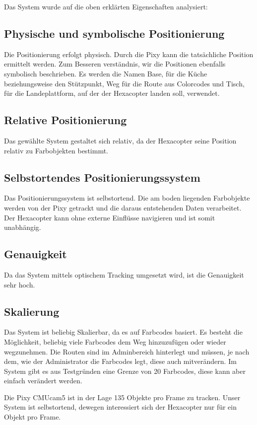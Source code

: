   Das System wurde auf die oben erklärten Eigenschaften analysiert:

  \subsection*{Physische und symbolische Positionierung}
  Die Positionierung erfolgt physisch. Durch die Pixy kann die tatsächliche Position ermittelt werden.
  Zum Besseren verständnis, wir die Positionen ebenfalls symbolisch beschrieben. Es werden die Namen Base, für die Küche beziehungsweise den Stützpunkt, Weg für die Route aus Colorcodes und Tisch, für die Landeplattform, auf der der Hexacopter landen soll, verwendet.

  \subsection*{Relative Positionierung}
  Das gewählte System gestaltet sich relativ, da der Hexacopter seine Position relativ zu Farbobjekten bestimmt.

  \subsection*{Selbstortendes Positionierungssystem}
  Das Positionierungssystem ist selbstortend. Die am boden liegenden Farbobjekte werden von der Pixy getrackt und die daraus entstehenden Daten verarbeitet. Der Hexacopter kann ohne externe Einflüsse navigieren und ist somit unabhängig.

  \subsection*{Genauigkeit}
  Da das System mittels optischem Tracking umgesetzt wird, ist die Genauigkeit sehr hoch.
  
  \subsection*{Skalierung}
  Das System ist beliebig Skalierbar, da es auf Farbcodes basiert. Es besteht die Möglichkeit, beliebig viele Farbcodes dem Weg hinzuzufügen oder wieder wegzunehmen. Die Routen sind im Adminbereich hinterlegt und müssen, je nach dem, wie der Administrator die Farbcodes legt, diese auch mitverändern. Im System gibt es aus Testgründen eine Grenze von 20 Farbcodes, diese kann aber einfach verändert werden.

  Die Pixy CMUcam5 ist in der Lage 135 Objekte pro Frame zu tracken. Unser System ist selbstortend, dewegen interessiert sich der Hexacopter nur für ein Objekt pro Frame. \cite{PIXY_Porting_Examplecode}

